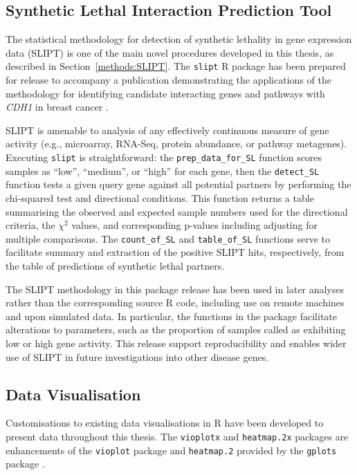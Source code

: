 \subsection{Synthetic Lethal Interaction Prediction Tool}
The statistical methodology for detection of synthetic lethality in gene expression data (\gls{SLIPT}) is one of the main novel procedures developed in this thesis, as described in Section~\ref{methods:SLIPT}. The \texttt{slipt} R package has been prepared for release to accompany a publication demonstrating the applications of the methodology for identifying candidate interacting genes and pathways with \textit{CDH1} in breast cancer \citep{TCGA2012}.

\gls{SLIPT} is amenable to analysis of any effectively continuous measure of gene activity (e.g., microarray, RNA-Seq, protein abundance, or pathway metagenes). Executing \texttt{slipt} is straightforward: the \texttt{prep\_data\_for\_SL} function scores samples as ``low'', ``medium'', or ``high'' for each gene, then the \texttt{detect\_SL} function tests a given query gene against all potential partners by performing the chi-squared test and directional conditions. This function returns a table summarising the observed and expected sample numbers used for the directional criteria, the $\chi^2$ values, and corresponding p-values including adjusting for multiple comparisons. The \texttt{count\_of\_SL} and \texttt{table\_of\_SL} functions serve to facilitate summary and extraction of the positive \gls{SLIPT} hits, respectively, from the table of predictions of synthetic lethal partners.

The \gls{SLIPT} methodology in this package release has been used in later analyses rather than the corresponding source R code, including use on remote machines and upon simulated data. In particular, the functions in the package facilitate alterations to parameters, such as the proportion of samples called as exhibiting low or high gene activity. This release support reproducibility and enables wider use of \gls{SLIPT} in future investigations into other disease genes.

\subsection{Data Visualisation}
Customisations to existing data visualisations in R have been developed to present data throughout this thesis. The \texttt{vioplotx} and \texttt{heatmap.2x} packages are enhancements of the \texttt{vioplot} package \citep{vioplot} and \texttt{heatmap.2} provided by the \texttt{gplots} package \citep{gplots}. 

